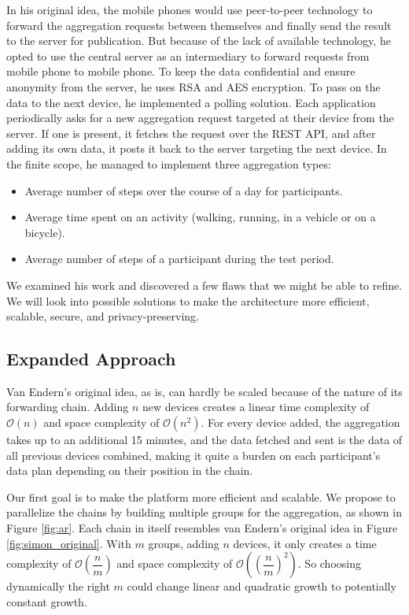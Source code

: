In his original idea, the mobile phones would use peer-to-peer technology to forward the aggregation requests between themselves and finally send the result to the server for publication. But because of the lack of available technology, he opted to use the central server as an intermediary to forward requests from mobile phone to mobile phone. To keep the data confidential and ensure anonymity from the server, he uses RSA and AES encryption. To pass on the data to the next device, he implemented a polling solution. Each application periodically asks for a new aggregation request targeted at their device from the server. If one is present, it fetches the request over the REST API, and after adding its own data, it posts it back to the server targeting the next device.
In the finite scope, he managed to implement three aggregation types:

\begin{itemize}
    \item Average number of steps over the course of a day for participants. 
    \item Average time spent on an activity (walking, running, in a vehicle or on a bicycle).
    \item Average number of steps of a participant during the test period. 
\end{itemize}

We examined his work and discovered a few flaws that we might be able to refine. We will look into possible solutions to make the architecture more efficient, scalable, secure, and privacy-preserving.

\subsection{Expanded Approach}
Van Endern's original idea, as is, can hardly be scaled because of the nature of its forwarding chain. Adding \(n\) new devices creates a linear time complexity of \(\mathcal{O}(n)\) and space complexity of \(\mathcal{O}(n^2)\). For every device added, the aggregation takes up to an additional 15 minutes, and the data fetched and sent is the data of all previous devices combined, making it quite a burden on each participant's data plan depending on their position in the chain.

Our first goal is to make the platform more efficient and scalable. We propose to parallelize the chains by building multiple groups for the aggregation, as shown in Figure \ref{fig:ar}. Each chain in itself resembles van Endern's original idea in Figure \ref{fig:simon_original}. With \(m\) groups, adding \(n\) devices, it only creates a time complexity of \(\mathcal{O}(\dfrac{n}{m})\) and space complexity of \(\mathcal{O}((\dfrac{n}{m})^2)\). So choosing dynamically the right \(m\) could change linear and quadratic growth to potentially constant growth. 


